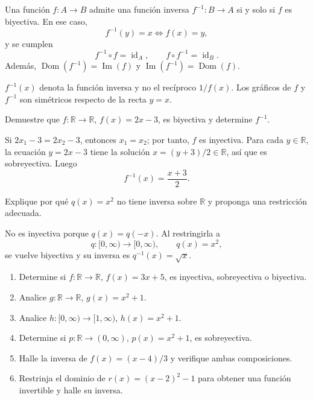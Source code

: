 \begin{teorema}
Una función $f:A\to B$ admite una función inversa $f^{-1}:B\to A$ si y solo si $f$ es biyectiva. En ese caso,
\[
f^{-1}(y)=x\iff f(x)=y,
\]
y se cumplen
\[
f^{-1}\circ f=\operatorname{id}_A,
\qquad
f\circ f^{-1}=\operatorname{id}_B.
\]
Además, $\operatorname{Dom}(f^{-1})=\operatorname{Im}(f)$ y $\operatorname{Im}(f^{-1})=\operatorname{Dom}(f)$.
\end{teorema}

\begin{nota}
$f^{-1}(x)$ denota la función inversa y no el recíproco $1/f(x)$. Los gráficos de $f$ y $f^{-1}$ son simétricos respecto de la recta $y=x$.
\end{nota}

\begin{ejemplo}
Demuestre que $f:\mathbb{R}\to\mathbb{R}$, $f(x)=2x-3$, es biyectiva y determine $f^{-1}$.
\end{ejemplo}
\ifmostrarSoluciones
\begin{solucion}
Si $2x_1-3=2x_2-3$, entonces $x_1=x_2$; por tanto, $f$ es inyectiva. Para cada $y\in\mathbb{R}$, la ecuación $y=2x-3$ tiene la solución $x=(y+3)/2\in\mathbb{R}$, así que es sobreyectiva. Luego
\[
f^{-1}(x)=\frac{x+3}{2}.
\]
\end{solucion}
\else\vspace{14mm}\fi

\begin{ejemplo}
Explique por qué $q(x)=x^2$ no tiene inversa sobre $\mathbb{R}$ y proponga una restricción adecuada.
\end{ejemplo}
\ifmostrarSoluciones
\begin{solucion}
No es inyectiva porque $q(x)=q(-x)$. Al restringirla a
\[
q:[0,\infty)\to[0,\infty),\qquad q(x)=x^2,
\]
se vuelve biyectiva y su inversa es $q^{-1}(x)=\sqrt{x}$.
\end{solucion}
\else\vspace{14mm}\fi

\begin{ejercicios}
\begin{enumerate}
  \item Determine si $f:\mathbb{R}\to\mathbb{R}$, $f(x)=3x+5$, es inyectiva, sobreyectiva o biyectiva.
  \item Analice $g:\mathbb{R}\to\mathbb{R}$, $g(x)=x^2+1$.
  \item Analice $h:[0,\infty)\to[1,\infty)$, $h(x)=x^2+1$.
  \item Determine si $p:\mathbb{R}\to(0,\infty)$, $p(x)=x^2+1$, es sobreyectiva.
  \item Halle la inversa de $f(x)=(x-4)/3$ y verifique ambas composiciones.
  \item Restrinja el dominio de $r(x)=(x-2)^2-1$ para obtener una función invertible y halle su inversa.
\end{enumerate}
\end{ejercicios}

